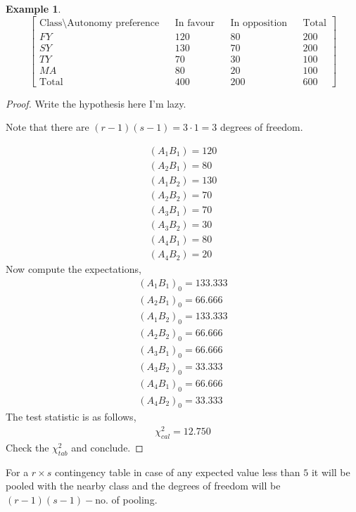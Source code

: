 \documentclass[oneside,11pt,pdftex]{book}%
\numberwithin{equation}{section}
\newtheorem{example}[theorem]{Example}
\numberwithin{section}{chapter}
\numberwithin{equation}{chapter}
\begin{document}
\begin{example}
	\[ \begin{bmatrix}
		\text{Class} \setminus \text{Autonomy preference} && \text{In favour} && \text{In opposition} && \text{Total}\\
		FY && 120 && 80 && 200\\
		SY && 130 && 70 && 200\\
		TY && 70 && 30 && 100\\
		MA && 80 && 20 && 100\\
		\text{Total} && 400 && 200 && 600
	\end{bmatrix} \]
\end{example}
\begin{proof}
	Write the hypothesis here I'm lazy.
	
	Note that there are $ (r-1)(s-1)=3\cdot1=3 $ degrees of freedom.
	
	\begin{align*}
		(A_1B_1)=120\\
		(A_2B_1)=80\\
		(A_1B_2)=130\\
		(A_2B_2)=70\\
		(A_3B_1)=70\\
		(A_3B_2)=30\\
		(A_4B_1)=80\\
		(A_4B_2)=20
	\end{align*}
	Now compute the expectations,
	\begin{align*}
		(A_1B_1)_0=133.333\\
		(A_2B_1)_0=66.666\\
		(A_1B_2)_0=133.333\\
		(A_2B_2)_0=66.666\\
		(A_3B_1)_0=66.666\\
		(A_3B_2)_0=33.333\\
		(A_4B_1)_0=66.666\\
		(A_4B_2)_0=33.333
	\end{align*}
The test statistic is as follows,
\begin{align*}
	\chi^2_{cal}=12.750
\end{align*}
Check the $ \chi^2_{tab} $ and conclude.
\end{proof}

For a $ r \times s $ contingency table in case of any expected value less than $ 5 $ it will be pooled with the nearby class and the degrees of freedom will be $ (r-1) (s-1)-$no. of pooling.
\end{document}
